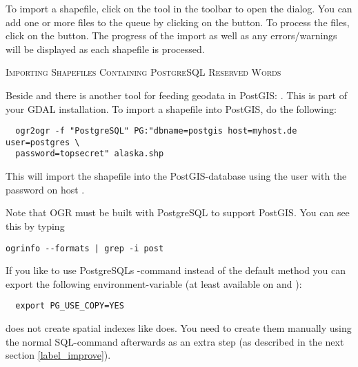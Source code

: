 To import a shapefile, click on the  tool in the 
toolbar to open the 
 dialog.
You can add one or more files to the queue by clicking on the 
button. To process the files, click on the  button. The progress of the
import as well as any errors/warnings will be displayed as each shapefile is
processed.  

\begin{Tip}\caption{\textsc{Importing Shapefiles Containing
PostgreSQL Reserved Words}}
\end{Tip} 

Beside  and  there is another tool for feeding
geodata in PostGIS: . This is part of your GDAL installation.
To import a shapefile into PostGIS, do the following:
\begin{verbatim}
  ogr2ogr -f "PostgreSQL" PG:"dbname=postgis host=myhost.de user=postgres \
  password=topsecret" alaska.shp
\end{verbatim}

This will import the shapefile  into the PostGIS-database
\usertext{postgis}
using the user  with the password  on host
\server{myhost.de}.

Note that OGR must be built with PostgreSQL to support PostGIS.
You can see this by typing
\begin{verbatim}
ogrinfo --formats | grep -i post
\end{verbatim}

If you like to use PostgreSQLs -command instead of the default
\filename{INSERT INTO} method you can export the following
environment-variable (at least available on \nix and \osx):
\begin{verbatim}
  export PG_USE_COPY=YES
\end{verbatim}

 does not create spatial indexes like 
does. You need to create them manually using the normal SQL-command
\filename{CREATE INDEX} afterwards as an extra step (as described in the next
section \ref{label_improve}).


